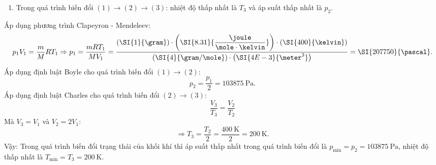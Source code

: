 \begin{vd}
{\begin{enumerate}[label=\alph*)]
\begin{center}
			\end{center}
			\item Trong quá trình biến đổi $(1)\rightarrow(2)\rightarrow(3)$: nhiệt độ thấp nhất là $T_3$ và áp suất thấp nhất là $p_2$.
		\end{enumerate}
		Áp dụng phương trình Clapeyron - Mendeleev:
		$$p_1V_1=\dfrac{m}{M}RT_1\Rightarrow p_1=\dfrac{mRT_1}{M V_1}=\dfrac{\left(\SI{1}{\gram}\right)\cdot\left(\SI{8.31}{\dfrac{\joule}{\mole\cdot\kelvin}}\right)\cdot\left(\SI{400}{\kelvin}\right)}{\left(\SI{4}{\gram/\mole}\right)\cdot\left(\SI{4E-3}{\meter^3}\right)}=\SI{207750}{\pascal}.$$
		Áp dụng định luật Boyle cho quá trình biến đổi $(1)\rightarrow(2)$:
		$$p_2=\dfrac{p_1}{2}=\SI{103875}{\pascal}.$$
		Áp dụng định luật Charles cho quá trình biến đổi $(2)\rightarrow(3)$:
		$$\dfrac{V_3}{T_3}=\dfrac{V_2}{T_2}$$
		Mà $V_3=V_1$ và $V_2=2V_1$:
		$$\Rightarrow T_3=\dfrac{T_2}{2}=\dfrac{\SI{400}{\kelvin}}{2}=\SI{200}{\kelvin}.$$
		Vậy: Trong quá trình biến đổi trạng thái của khối khí thì áp suất thấp nhất trong quá trình biến đổi là $p_\text{min}=p_2=\SI{103875}{\pascal}$, nhiệt độ thấp nhất là $T_\text{min}=T_3=\SI{200}{\kelvin}$.
}
\end{vd}
